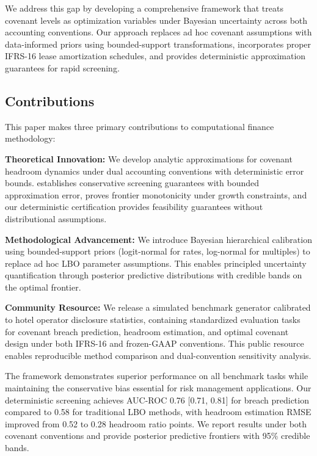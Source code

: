 \documentclass[11pt,a4paper]{article}
\numberwithin{equation}{section}
\theoremstyle{plain}
\theoremstyle{definition}
\begin{document}
We address this gap by developing a comprehensive framework that treats covenant levels as optimization variables under Bayesian uncertainty across both accounting conventions. Our approach replaces ad hoc covenant assumptions with data-informed priors using bounded-support transformations, incorporates proper IFRS-16 lease amortization schedules, and provides deterministic approximation guarantees for rapid screening.

\subsection{Contributions}

This paper makes three primary contributions to computational finance methodology:

\textbf{Theoretical Innovation:} We develop analytic approximations for covenant headroom dynamics under dual accounting conventions with deterministic error bounds.  establishes conservative screening guarantees with bounded approximation error,  proves frontier monotonicity under growth constraints, and our deterministic certification provides feasibility guarantees without distributional assumptions.

\textbf{Methodological Advancement:} We introduce Bayesian hierarchical calibration using bounded-support priors (logit-normal for rates, log-normal for multiples) to replace ad hoc LBO parameter assumptions. This enables principled uncertainty quantification through posterior predictive distributions with credible bands on the optimal frontier.

\textbf{Community Resource:} We release a simulated benchmark generator calibrated to hotel operator disclosure statistics, containing standardized evaluation tasks for covenant breach prediction, headroom estimation, and optimal covenant design under both IFRS-16 and frozen-GAAP conventions. This public resource enables reproducible method comparison and dual-convention sensitivity analysis.

The framework demonstrates superior performance on all benchmark tasks while maintaining the conservative bias essential for risk management applications. Our deterministic screening achieves AUC-ROC 0.76 [0.71, 0.81] for breach prediction compared to 0.58 for traditional LBO methods, with headroom estimation RMSE improved from 0.52 to 0.28 headroom ratio points. We report results under both covenant conventions and provide posterior predictive frontiers with 95\% credible bands.
\end{document}
